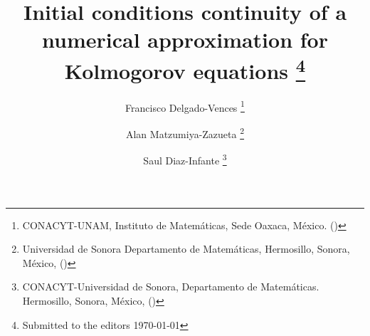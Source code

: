 \usepackage{lipsum}
\usepackage{amsfonts}
\usepackage{graphicx}
\usepackage{epstopdf}
\usepackage{algorithmic}
\usepackage[square, sort&compress, numbers]{natbib}
\usepackage[utf8x]{inputenc}
\usepackage{bm}
\usepackage{booktabs}
\usepackage{etoolbox}
\usepackage{todonotes}
\usepackage{epstopdf}
\usepackage{siunitx}
\usepackage{amsopn}
\patchcmd{\SetTagPlusEndMark}{$}{}{}{}
\patchcmd{\SetTagPlusEndMark}{$}{}{}{}
\ifpdf
\else
\fi

\newcommand{\creflastconjunction}{, and~}

\DeclareMathOperator{\diag}{diag}

\newcommand{\cqd}{\hfill$\Box$}
\newcommand{\f}{{\mathcal F}}
\newcommand{\IR}{{\mathbb R}}
\newcommand{\R}{{\mathbb R}}
\newcommand{\IN}{{\mathbb N}}
\newcommand{\ind}{\mbox{\Large$\chi$}}
\newcommand{\tor}{{\mathbb T}}
\newcommand{\G}{{\mathbb G}}
\newcommand{\beq}{\begin{equation}}
\newcommand{\eeq}{\end{equation}}
\newcommand{\bal}{\begin{align}}
\newcommand{\eal}{\end{align}}
\newcommand{\beqn}{\begin{equation*}}
\newcommand{\eeqn}{\end{equation*}}
\newcommand{\baln}{\begin{align*}}
\newcommand{\ealn}{\end{align*}}
\newcommand{\tbar}{\bar t}
\newcommand{\xbar}{\bar x}
\newcommand{\ep}{\epsilon}
\newcommand{\Pb}{\mathbb P}
\newcommand{\Rl}{\mathbb R}
\newcommand{\E}{\mathbb{E}}
\newcommand{\tf}{\mathcal{F}}
\newcommand{\hac}{\mathcal{H}}
\newcommand{\hact}{\mathcal{H}_T}


\title{%
        Initial conditions continuity of a numerical 
        approximation for Kolmogorov equations
    \thanks{Submitted to the editors \today}
}
\author{
    Francisco Delgado-Vences
    \footnotemark[1]
    \thanks{
    CONACYT-UNAM, 
    Instituto de Matem\'aticas, 
    Sede Oaxaca, M\'exico.
    ()
    }
%
    \and %
    Alan Matzumiya-Zazueta
   \footnotemark[3]
    \thanks{
    Universidad de Sonora
    Departamento de Matem\'aticas,
    Hermosillo, Sonora, M\'exico,
    ()
    }
    \and %
    Saul Diaz-Infante
   \footnotemark[2]
    \thanks{%
    CONACYT-Universidad de Sonora, 
    Departamento de Matem\'aticas. 
    Hermosillo, Sonora, M\'exico,
    ()
    }
}

\DeclareMathOperator{\sech}{sech}
\ifpdf
\else
\fi


